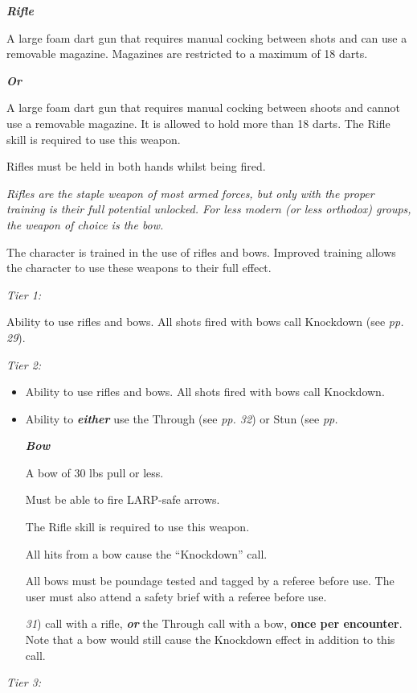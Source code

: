 \textbf{\textit{Rifle}}

A large foam dart gun that requires manual cocking between shots and can use a removable magazine. Magazines are restricted to a maximum of 18 darts.

\textbf{\textit{Or}}

A large foam dart gun that requires manual cocking between shoots and cannot use a removable magazine. It is allowed to hold more than 18 darts. The Rifle skill is required to use this weapon.

Rifles must be held in both hands whilst being fired.

\textit{Rifles are the staple weapon of most armed forces, but only with the proper training is their full potential unlocked. For less modern (or less orthodox) groups, the weapon of choice is the bow.}

The character is trained in the use of rifles and bows. Improved training allows the character to use these weapons to their full effect.

\textit{Tier 1:}

Ability to use rifles and bows. All shots fired with bows call Knockdown (see \textit{pp. 29}).

\textit{Tier 2:}

\begin{itemize}
\item Ability to use rifles and bows. All shots fired with bows call Knockdown.

\item Ability to \textbf{\textit{either}} use the Through (see \textit{pp. 32}) or Stun (see \textit{pp.}

\textbf{\textit{Bow}}

A bow of 30 lbs pull or less.

Must be able to fire LARP-safe arrows.

The Rifle skill is required to use this weapon.

All hits from a bow cause the ``Knockdown'' call.

All bows must be poundage tested and tagged by a referee before use. The user must also attend a safety brief with a referee before use.

\textit{31}) call with a rifle, \textbf{\textit{or}} the Through call with a bow, \textbf{once per encounter}. Note that a bow would still cause the Knockdown effect in addition to this call.

\end{itemize}
\textit{Tier 3:}

